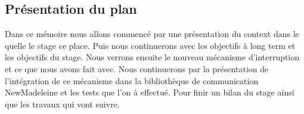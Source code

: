 \subsection{Présentation du plan}

Dans ce mémoire nous allons commencé par une présentation du context dans le quelle le stage ce place.
Puis nous continuerons avec les objectifs à long term et les objectifs du stage.
Nous verrons ensuite le nouveau mécanisme d'interruption et ce que nous avons fait avec.
Nous continuerons par la présentation de l'intégration de ce mécanisme dans la bibliothèque de communication NewMadeleine et les tests que l'on à effectué.
Pour finir un bilan du stage ainsi que les travaux qui vont suivre.
